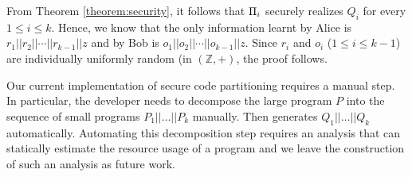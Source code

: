  From Theorem \ref{theorem:security}, it follows that $\Pi_i$ securely realizes $Q_i$ for every $1\leq i\leq k$. Hence, we know that the only information learnt by Alice is $r_1||r_2||\cdots||r_{k-1}||z$ and by Bob is $o_1||o_2||\cdots||o_{k-1}||z$. Since $r_i$ and $o_i$ ($1\leq i\leq k-1$) are individually uniformly random (in $(\mathbb{Z},+)$, the proof follows. 

Our current implementation of secure code partitioning requires a manual step.
In particular, the developer needs to decompose the large program $P$ into 
the sequence of small programs $P_1||\ldots||P_k$ manually.
Then \tool generates $Q_1||\ldots||Q_k$ automatically.
Automating this decomposition step requires an analysis that can 
statically estimate the resource usage of a \tool program and we leave the construction of such
an analysis as future work.